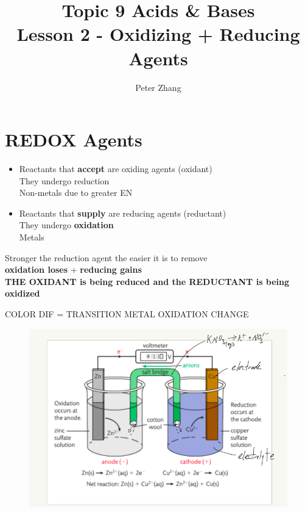 \documentclass{article}
\title{Topic 9 Acids \& Bases\\Lesson 2 - Oxidizing + Reducing Agents}
\author{Peter Zhang}
\begin{document}
\maketitle
\tableofcontents
\newpage

\section{REDOX Agents}
\begin{itemize}
\item Reactants that \textbf{accept}  are oxiding agents (oxidant)\\They undergo reduction\\Non-metals due to greater EN
\item Reactants that \textbf{supply}  are reducing agents (reductant)\\They undergo \textbf{oxidation}\\Metals
\end{itemize}

Stronger the reduction agent the easier it is to remove \\\textbf{oxidation loses } + \textbf{reducing gains }\\\textbf{THE OXIDANT is being reduced and the REDUCTANT is being oxidized}


COLOR DIF = TRANSITION METAL OXIDATION CHANGE

\begin{figure}[H]
\includegraphics[width=\textwidth]{5.2circuit.png}
\end{figure}
\end{document}
